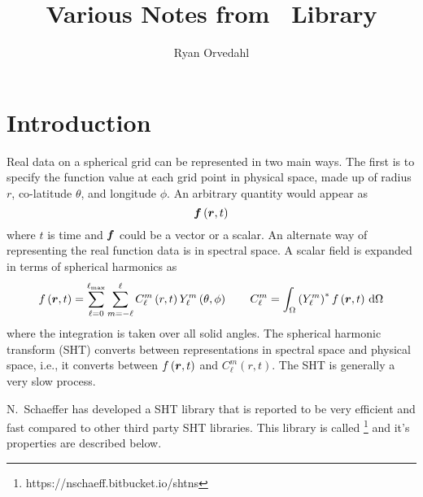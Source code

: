 \documentclass[10pt,letterpaper]{article}
\begin{document}
\title{Various Notes from \shtns\ Library}
\author{Ryan Orvedahl}

\maketitle

\section{Introduction}
Real data on a spherical grid can be represented in two main ways. The first
is to specify the function value at each grid point in physical space,
made up of radius $r$, co-latitude $\theta$, and longitude $\phi$. An arbitrary
quantity would appear as
\begin{equation}
 \bm{f}\left(\bm{r},t\right)
\end{equation}
where $t$ is time and $\bm{f}$ could be a vector or a scalar.
An alternate way of representing the real function data is in spectral space.
A scalar field is expanded in terms of spherical harmonics as
\begin{equation}
 f\left(\bm{r},t\right) = \sum\limits_{\ell=0}^{\ell_\mathrm{max}}
                                 \sum\limits_{m=-\ell}^{\ell}
                C_\ell^m\left(r,t\right) Y_\ell^m\left(\theta,\phi\right)
\qquad
C_\ell^m = \int_\Omega \left(Y_\ell^m\right)^* f\left(\bm{r},t\right)
           \,\mathrm{d}\Omega
\end{equation}
where the integration is taken over all solid angles. The spherical harmonic
transform (SHT) converts between representations in spectral space and
physical space, i.e., it converts between $f\left(\bm{r},t\right)$
and $C_\ell^m\left(r,t\right)$. The SHT is generally a very slow process.

N.~Schaeffer has developed a SHT library that is reported to be very efficient
and fast compared to other third party SHT libraries. This library is called
\shtns\footnote{https://nschaeff.bitbucket.io/shtns} and it's properties are
described below.
\end{document}
